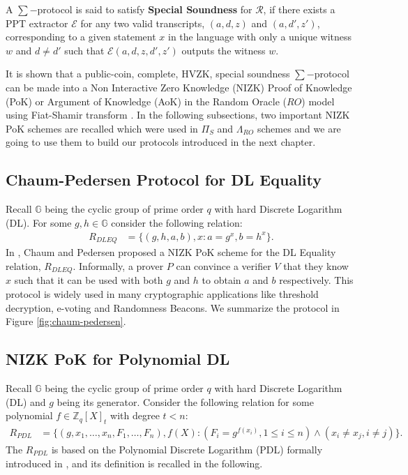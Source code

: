 \begin{definition}
  A $\sum-$protocol is said to satisfy \textbf{Special Soundness} for $\mathcal{R}$, 
  if there exists a PPT extractor $\mathcal{E}$ for any two valid transcripts, $(a,d,z)$ and 
  $(a,d',z')$, corresponding to a given statement $x$ in the language with only a unique 
  witness $w$ and $d\neq d'$ such that $\mathcal{E}(a,d,z,d',z')$ outputs the witness $w$. 
\end{definition}

It is shown that a public-coin, complete, HVZK, special soundness $\sum-$protocol can be made into a
Non Interactive Zero Knowledge (NIZK) Proof of Knowledge (PoK) or Argument of Knowledge (AoK) in the 
Random Oracle ($RO$) model using Fiat-Shamir transform \cite{10.1007/3-540-47721-7_12}. 
In the following subsections, two important NIZK PoK schemes are recalled which were used in $\Pi_S$ and 
$\Lambda_{RO}$ schemes and we are going to use them to build our protocols introduced in the next 
chapter. 

\subsection{Chaum-Pedersen Protocol for DL Equality}
\label{subsec:chaum-pedersen}
Recall $\mathbb{G}$ being the cyclic group of prime order $q$ with hard Discrete Logarithm (DL). 
For some $g,h\in \mathbb{G}$ consider the following relation:
\begin{align*}
  R_{DLEQ} &= \{(g,h,a,b),x : a=g^x, b=h^x\}.
\end{align*}
In \cite{10.1007/3-540-48071-4_7}, Chaum and Pedersen proposed a NIZK PoK scheme for the DL Equality 
relation, $R_{DLEQ}$. Informally, a prover $P$ can convince a verifier $V$ that they know $x$ such that
it can be used with both $g$ and $h$ to obtain $a$ and $b$ respectively. This protocol is widely used in
many cryptographic applications like threshold decryption, e-voting and Randomness Beacons. 
We summarize the protocol in Figure \ref{fig:chaum-pedersen}.


\subsection{NIZK PoK for Polynomial DL}
\label{subsec:polynomial-dl}
Recall $\mathbb{G}$ being the cyclic group of prime order $q$ with hard Discrete Logarithm (DL) and $g$ 
being its generator. Consider the following relation for some polynomial $f\in\mathbb{Z}_q[X]_t$ with
degree $t<n$:
\begin{align*}
  R_{PDL} &= \{(g,x_1,\dots,x_n,F_1,\dots,F_n),f(X) : (F_i=g^{f(x_i)}, 1\leq i\leq n)\wedge(x_i\neq x_j, i\neq j)\}.
\end{align*}
The $R_{PDL}$ is based on the Polynomial Discrete Logarithm (PDL) formally introduced in \cite{cryptoeprint:2023/1669}, 
and its definition is recalled in the following.


